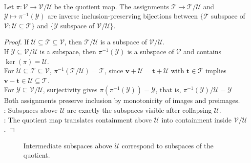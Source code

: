 \begin{theorem} \label{thm:subspace-correspondence-quotient} \\
Let $\pi:\mathcal{V}\to\mathcal{V}/\mathcal{U}$ be the quotient map. The assignments $\mathcal{T}\longmapsto \mathcal{T}/\mathcal{U}$ and $\mathcal{Y}\longmapsto \pi^{-1}(\mathcal{Y})$ are inverse inclusion-preserving bijections between $\{\mathcal{T}$ subspace of $\mathcal{V}:\mathcal{U}\subseteq\mathcal{T}\}$ and $\{\mathcal{Y}$ subspace of $\mathcal{V}/\mathcal{U}\}$.
\begin{proof}
If $\mathcal{U}\subseteq\mathcal{T}\subseteq\mathcal{V}$, then $\mathcal{T}/\mathcal{U}$ is a subspace of $\mathcal{V}/\mathcal{U}$.\\
If $\mathcal{Y}\subseteq\mathcal{V}/\mathcal{U}$ is a subspace, then $\pi^{-1}(\mathcal{Y})$ is a subspace of $\mathcal{V}$ and contains $\ker(\pi)=\mathcal{U}$.\\
For $\mathcal{U}\subseteq\mathcal{T}\subseteq\mathcal{V}$, $\pi^{-1}(\mathcal{T}/\mathcal{U})=\mathcal{T}$, since $\mathbf{v}+\mathcal{U}=\mathbf{t}+\mathcal{U}$ with $\mathbf{t}\in\mathcal{T}$ implies $\mathbf{v}-\mathbf{t}\in\mathcal{U}\subseteq\mathcal{T}$.\\
For $\mathcal{Y}\subseteq\mathcal{V}/\mathcal{U}$, surjectivity gives $\pi\left(\pi^{-1}(\mathcal{Y})\right)=\mathcal{Y}$, that is, $\pi^{-1}(\mathcal{Y})/\mathcal{U}=\mathcal{Y}$\\
Both assignments preserve inclusion by monotonicity of images and preimages.\\
: Subspaces above $\mathcal{U}$ are exactly the subspaces visible after collapsing $\mathcal{U}$.\\
: The quotient map translates containment above $\mathcal{U}$ into containment inside $\mathcal{V}/\mathcal{U}$.
\end{proof}
\end{theorem}

\begin{figure}[H]
  \centering
  
  \caption{Intermediate subspaces above $\mathcal{U}$ correspond to subspaces of the quotient.}
  \label{fig:quotient-correspondence-subspaces}
\end{figure}

